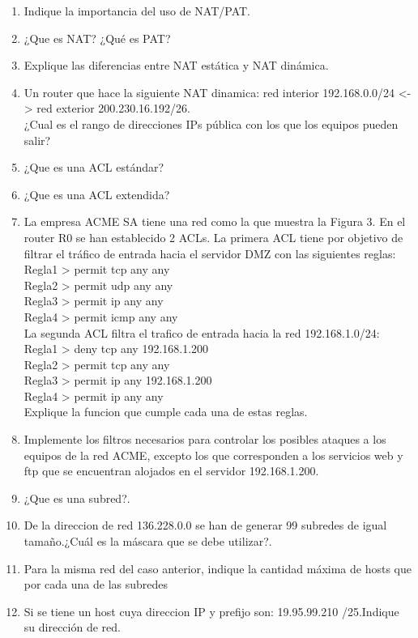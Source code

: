 \documentclass{udparticle}
\begin{document}
\begin{enumerate}
\item Indique la importancia del uso de NAT/PAT.
\item ¿Que es NAT? ¿Qué es PAT?
\item Explique las diferencias entre NAT estática y NAT dinámica.
\item Un router que hace la siguiente NAT dinamica: red interior 
192.168.0.0/24 <-> red exterior 200.230.16.192/26.\\
¿Cual es el rango de direcciones IPs pública con los que los equipos 
pueden salir?
\item ¿Que es una ACL estándar?
\item ¿Que es una ACL extendida?
\item La empresa ACME SA tiene una red como la que muestra la Figura 3. 
En el router R0 se han establecido 2 ACLs. La primera ACL tiene por 
objetivo de filtrar el tráfico de entrada hacia el 
servidor DMZ con las siguientes reglas:\\
Regla1 > permit tcp any any\\
Regla2 > permit udp any any\\
Regla3 > permit ip any any\\
Regla4 > permit icmp any any\\
La segunda ACL filtra el trafico de entrada hacia la red 
192.168.1.0/24:\\
Regla1 > deny tcp any 192.168.1.200\\
Regla2 > permit tcp any any\\
Regla3 > permit ip any 192.168.1.200\\
Regla4 > permit ip any any\\
Explique la funcion que cumple cada una de estas reglas.\\
\item Implemente los filtros necesarios para controlar los posibles ataques a los equipos de la red ACME, excepto los que corresponden a los servicios web y ftp que se encuentran alojados en el
servidor 192.168.1.200.
\item ¿Que es una subred?.
\item De la direccion de red 136.228.0.0 se han de generar 99 subredes de igual tamaño.¿Cuál es la máscara que se debe utilizar?.
\item Para la misma red del caso anterior, indique la cantidad máxima de hosts que por cada una de las subredes
\item Si se tiene un host cuya direccion IP y prefijo son: 19.95.99.210 
/25.Indique su dirección de red.

\end{enumerate}
\end{document}
